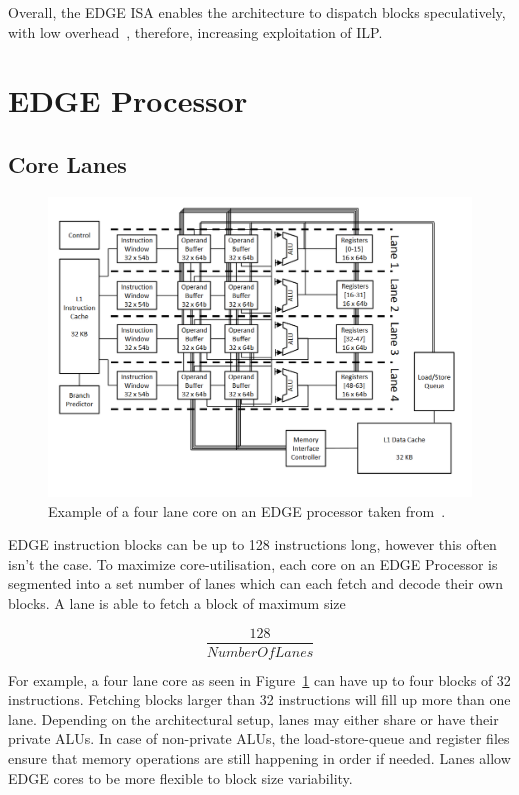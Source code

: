 Overall, the EDGE ISA enables the architecture to dispatch blocks speculatively, with low overhead~\cite{putnam2010e2,kim2007tflex}, therefore, increasing exploitation of ILP.

\section{EDGE Processor}

\subsection{Core Lanes}
 \begin{figure}[t]
 \center
 \includegraphics[width=1\textwidth]{background/graphics/e2segment.png}
 \caption{Example of a four lane core on an EDGE processor taken from~\cite{e2smith}.}\label{fig:e2segment}
 \end{figure}
 
EDGE instruction blocks can be up to 128 instructions long, however this often isn't the case.
To maximize core-utilisation, each core on an EDGE Processor is segmented into a set number of lanes which can each fetch and decode their own blocks.
A lane is able to fetch a block of maximum size

\begin{equation}
\frac{128}{NumberOfLanes}
\end{equation}

For example, a four lane core as seen in Figure~\ref{fig:e2segment} can have up to four blocks of 32 instructions.
Fetching blocks larger than 32 instructions will fill up more than one lane.
Depending on the architectural setup, lanes may either share or have their private ALUs.
In case of non-private ALUs, the load-store-queue and register files ensure that memory operations are still happening in order if needed.
Lanes allow EDGE cores to be more flexible to block size variability.

